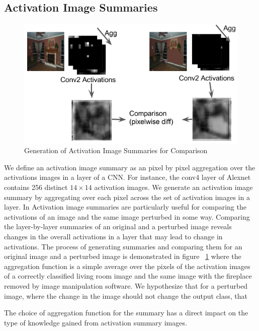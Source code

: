 \subsection{Activation Image Summaries}


\begin{figure}[b]
\centering
\includegraphics[width=\columnwidth]{figures/activation_image_summary_fig}
\caption{Generation of Activation Image Summaries for Comparison}
\label{fig:act_im_summary_fig}
\end{figure}

We define an activation image summary as an pixel by pixel aggregation over the activations images in a layer of a CNN. For instance, the conv4 layer of Alexnet~\cite{alexnet} contains 256 distinct $14 \times 14$ activation images. We generate an activation image summary by aggregating over each pixel across the set of activation images in a layer. In Activation image summaries are particularly useful for comparing the activations of an image and the same image perturbed in some way. Comparing the layer-by-layer summaries of an original and a perturbed image reveals changes in the overall activations in a layer that may lead to change in activations. The process of generating summaries and comparing them for an original image and a perturbed image is demonstrated in figure ~\ref{fig:act_im_summary_fig} where the aggregation function is a simple average over the pixels of the activation images of a correctly classified living room image and the same image with the fireplace removed by image manipulation software. We hypothesize that for a perturbed image, where the change in the image should not change the output class, that 

The choice of aggregation function for the summary has a direct impact on the type of knowledge gained from activation summary images. 